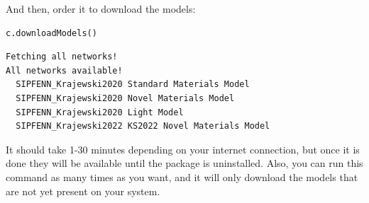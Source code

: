 And then, order it to download the models:

\begin{verbatim}
c.downloadModels()
\end{verbatim}

\begin{verbatim}
Fetching all networks!
All networks available!
  SIPFENN_Krajewski2020 Standard Materials Model
  SIPFENN_Krajewski2020 Novel Materials Model
  SIPFENN_Krajewski2020 Light Model
  SIPFENN_Krajewski2022 KS2022 Novel Materials Model
\end{verbatim}

It should take 1-30 minutes depending on your internet connection, but
once it is done they will be available until the package is uninstalled.
Also, you can run this command as many times as you want, and it will
only download the models that are not yet present on your system.

